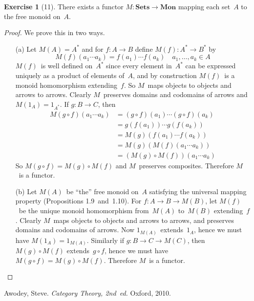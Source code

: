 \documentclass[letterpaper,12pt]{article}
\newcommand{\Sets}{\mathbf{Sets}}
\newcommand{\Mon}{\mathbf{Mon}}
\renewcommand{\star}[1]{#1^{*}}
\theoremstyle{definition}
\newtheorem*{exer}{Exercise}
\theoremstyle{remark}
\theoremstyle{direction}
\begin{document}
\begin{exer}[11]
There exists a functor \(M:\Sets\to\Mon\) mapping each set~\(A\) to the free monoid on~\(A\).
\end{exer}
\begin{proof}
We prove this in two ways.
\begin{enumerate}[itemsep=0pt]
\item[(a)] Let \(M(A)=\star{A}\) and for \(f:A\to B\) define \(M(f):\star{A}\to\star{B}\) by
\[M(f)(a_1\cdots a_k)=f(a_1)\cdots f(a_k)\quad a_1,\ldots,a_k\in A\]
\(M(f)\)~is well defined on~\(\star{A}\) since every element in~\(\star{A}\) can be expressed uniquely as a product of elements of~\(A\), and by construction \(M(f)\)~is a monoid homomorphism extending~\(f\). So \(M\)~maps objects to objects and arrows to arrows. Clearly \(M\)~preserves domains and codomains of arrows and \(M(1_A)=1_{\star{A}}\). If \(g:B\to C\), then
\begin{align*}
M(g\circ f)(a_1\cdots a_k)&=(g\circ f)(a_1)\cdots(g\circ f)(a_k)\\
	&=g(f(a_1))\cdots g(f(a_k))\\
	&=M(g)(f(a_1)\cdots f(a_k))\\
	&=M(g)(M(f)(a_1\cdots a_k))\\
	&=(M(g)\circ M(f))(a_1\cdots a_k)
\end{align*}
So \(M(g\circ f)=M(g)\circ M(f)\) and \(M\)~preserves composites. Therefore \(M\)~is a functor.
\item[(b)] Let \(M(A)\)~be ``the'' free monoid on~\(A\) satisfying the universal mapping property (Propositions 1.9~and~1.10). For \(f:A\to B\to M(B)\), let \(M(f)\)~be the unique monoid homomorphism from~\(M(A)\) to~\(M(B)\) extending~\(f\). Clearly \(M\)~maps objects to objects and arrows to arrows, and preserves domains and codomains of arrows. Now \(1_{M(A)}\)~extends~\(1_A\), hence we must have \(M(1_A)=1_{M(A)}\). Similarly if \(g:B\to C\to M(C)\), then \(M(g)\circ M(f)\) extends~\(g\circ f\), hence we must have \(M(g\circ f)=M(g)\circ M(f)\). Therefore \(M\)~is a functor.\qedhere
\end{enumerate}
\end{proof}

\begin{thebibliography}{0}
 Awodey, Steve. \textit{Category Theory, 2nd~ed.} Oxford, 2010.
\end{thebibliography}
\end{document}
